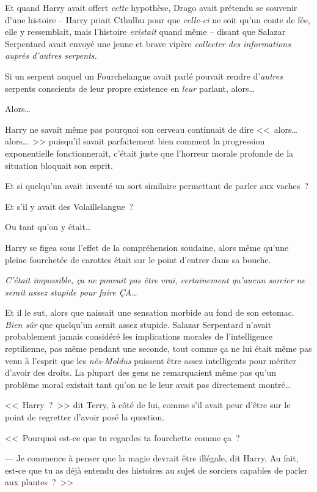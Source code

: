 Et quand Harry avait offert \emph{cette} hypothèse, Drago avait prétendu se souvenir d'une histoire -- Harry priait Cthulhu pour que \emph{celle-ci} ne soit qu'un conte de fée, elle y ressemblait, mais l'histoire \emph{existait} quand même -- disant que Salazar Serpentard avait envoyé une jeune et brave vipère \emph{collecter des informations auprès d'autres serpents.}

Si un serpent auquel un Fourchelangue avait parlé pouvait rendre d'\emph{autres} serpents conscients de leur propre existence en \emph{leur} parlant, alors…

Alors…

Harry ne savait même pas pourquoi son cerveau continuait de dire <<~alors… alors…~>> puisqu'il savait parfaitement bien comment la progression exponentielle fonctionnerait, c'était juste que l'horreur morale profonde de la situation bloquait son esprit.

Et si quelqu'un avait inventé un sort similaire permettant de parler aux vaches~?

Et s'il y avait des Volaillelangue~?

Ou tant qu'on y était…

Harry se figea sous l'effet de la compréhension soudaine, alors même qu'une pleine fourchetée de carottes était sur le point d'entrer dans sa bouche.

\emph{C'était impossible, ça ne pouvait pas être vrai, certainement qu'aucun sorcier ne serait assez stupide pour faire ÇA…}

Et il le sut, alors que naissait une sensation morbide au fond de son estomac. \emph{Bien sûr} que quelqu'un serait assez stupide. Salazar Serpentard n'avait probablement jamais considéré les implications morales de l'intelligence reptilienne, pas même pendant une seconde, tout comme ça ne lui était même pas venu à l'esprit que les \emph{nés-Moldus} puissent être assez intelligents pour mériter d'avoir des droits. La plupart des gens ne remarquaient même pas qu'un problème moral existait tant qu'on ne le leur avait pas directement montré…

<<~Harry~?~>> dit Terry, à côté de lui, comme s'il avait peur d'être sur le point de regretter d'avoir posé la question.

<<~Pourquoi est-ce que tu regardes ta fourchette comme ça~?

--- Je commence à penser que la magie devrait être illégale, dit Harry. Au fait, est-ce que tu as déjà entendu des histoires au sujet de sorciers capables de parler aux plantes~?~>>

